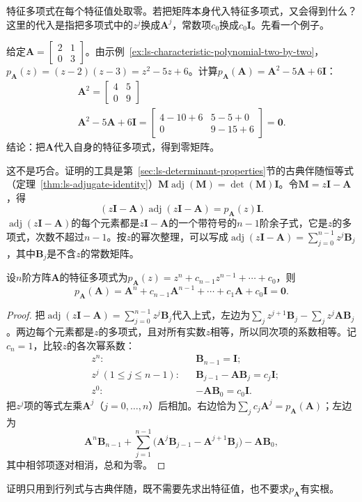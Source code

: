 特征多项式在每个特征值处取零。若把矩阵本身代入特征多项式，又会得到什么？这里的代入是指把多项式中的$z^j$换成$\bm A^j$，常数项$c_0$换成$c_0\bm I$。先看一个例子。
\begin{example}[把矩阵代入它的特征多项式]
\label{ex:ls-cayley-hamilton-two-by-two}
给定$\bm A=\left[\begin{smallmatrix}2&1\\0&3\end{smallmatrix}\right]$。由示例~\ref{ex:ls-characteristic-polynomial-two-by-two}，$p_{\bm A}(z)=(z-2)(z-3)=z^2-5z+6$。计算$p_{\bm A}(\bm A)=\bm A^2-5\bm A+6\bm I$：
\[
\begin{gathered}
\bm A^2=\begin{bmatrix}4&5\\0&9\end{bmatrix}\\
\bm A^2-5\bm A+6\bm I
 =\begin{bmatrix}4-10+6&5-5+0\\0&9-15+6\end{bmatrix}
 =\bm0 .
\end{gathered}
\]
结论：把$\bm A$代入自身的特征多项式，得到零矩阵。
\end{example}
这不是巧合。证明的工具是第~\ref{sec:ls-determinant-properties}节的古典伴随恒等式（定理~\ref{thm:ls-adjugate-identity}）$\bm M\operatorname{adj}(\bm M)=\det(\bm M)\bm I$。令$\bm M=z\bm I-\bm A$，得
\[
 (z\bm I-\bm A)\operatorname{adj}(z\bm I-\bm A)=p_{\bm A}(z)\bm I .
\]
$\operatorname{adj}(z\bm I-\bm A)$的每个元素都是$z\bm I-\bm A$的一个带符号的$n-1$阶余子式，它是$z$的多项式，次数不超过$n-1$。按$z$的幂次整理，可以写成$\operatorname{adj}(z\bm I-\bm A)=\sum_{j=0}^{n-1}z^j\bm B_j$，其中$\bm B_j$是不含$z$的常数矩阵。
\begin{theorem}
\label{thm:ls-cayley-hamilton}
设$n$阶方阵$\bm A$的特征多项式为$p_{\bm A}(z)=z^n+c_{n-1}z^{n-1}+\cdots+c_0$，则
\[
 p_{\bm A}(\bm A)
 =\bm A^n+c_{n-1}\bm A^{n-1}+\cdots+c_1\bm A+c_0\bm I=\bm0.
\]
\end{theorem}
\begin{proof}
把$\operatorname{adj}(z\bm I-\bm A)=\sum_{j=0}^{n-1}z^j\bm B_j$代入上式，左边为$\sum_jz^{j+1}\bm B_j-\sum_jz^j\bm A\bm B_j$。两边每个元素都是$z$的多项式，且对所有实数$z$相等，所以同次项的系数相等。记$c_n=1$，比较$z$的各次幂系数：
\[
 \begin{aligned}
 &z^n: &&\bm B_{n-1}=\bm I;\\
 &z^j\ (1\leq j\leq n-1): &&\bm B_{j-1}-\bm A\bm B_j=c_j\bm I;\\
 &z^0: &&-\bm A\bm B_0=c_0\bm I .
 \end{aligned}
\]
把$z^j$项的等式左乘$\bm A^j$（$j=0,\ldots,n$）后相加。右边恰为$\sum_jc_j\bm A^j=p_{\bm A}(\bm A)$；左边为
\[
 \bm A^n\bm B_{n-1}+\sum_{j=1}^{n-1}\bigl(\bm A^j\bm B_{j-1}-\bm A^{j+1}\bm B_j\bigr)-\bm A\bm B_0 ,
\]
其中相邻项逐对相消，总和为零。
\end{proof}
证明只用到行列式与古典伴随，既不需要先求出特征值，也不要求$p_{\bm A}$有实根。

